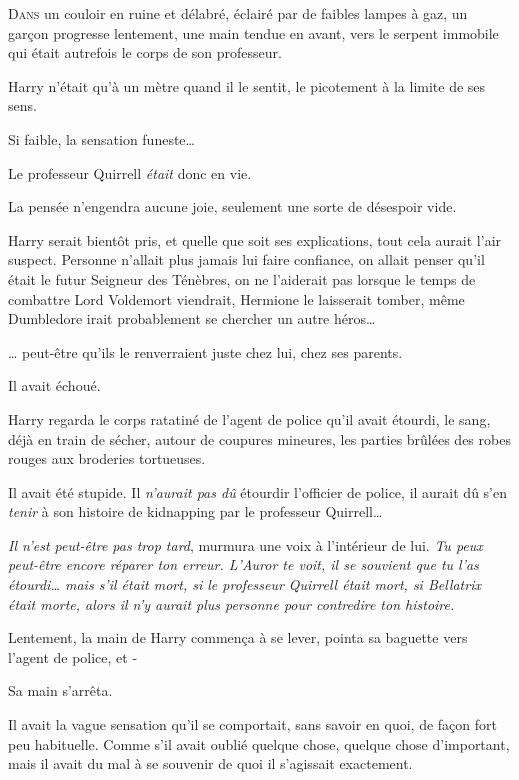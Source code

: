 
\lettrine{D}{ans} un couloir en ruine et délabré, éclairé par de faibles lampes à gaz, un garçon progresse lentement, une main tendue en avant, vers le serpent immobile qui était autrefois le corps de son professeur.

Harry n'était qu'à un mètre quand il le sentit, le picotement à la limite de ses sens.

Si faible, la sensation funeste…

Le professeur Quirrell \emph{était} donc en vie.

La pensée n'engendra aucune joie, seulement une sorte de désespoir vide.

Harry serait bientôt pris, et quelle que soit ses explications, tout cela aurait l'air suspect. Personne n'allait plus jamais lui faire confiance, on allait penser qu'il était le futur Seigneur des Ténèbres, on ne l'aiderait pas lorsque le temps de combattre Lord Voldemort viendrait, Hermione le laisserait tomber, même Dumbledore irait probablement se chercher un autre héros…

… peut-être qu'ils le renverraient juste chez lui, chez ses parents.

Il avait échoué.

Harry regarda le corps ratatiné de l'agent de police qu'il avait étourdi, le sang, déjà en train de sécher, autour de coupures mineures, les parties brûlées des robes rouges aux broderies tortueuses.

Il avait été stupide. Il \emph{n'aurait pas dû} étourdir l'officier de police, il aurait dû s'en \emph{tenir} à son histoire de kidnapping par le professeur Quirrell…

\emph{Il n'est peut-être pas trop tard}, murmura une voix à l'intérieur de lui. \emph{Tu peux peut-être encore réparer ton erreur. L'Auror te voit, il se souvient que tu l'as étourdi… mais s'il était mort, si le professeur Quirrell était mort, si Bellatrix était morte, alors il n'y aurait plus personne pour contredire ton histoire.}

Lentement, la main de Harry commença à se lever, pointa sa baguette vers l'agent de police, et -

Sa main s'arrêta.

Il avait la vague sensation qu'il se comportait, sans savoir en quoi, de façon fort peu habituelle. Comme s'il avait oublié quelque chose, quelque chose d'important, mais il avait du mal à se souvenir de quoi il s'agissait exactement.

